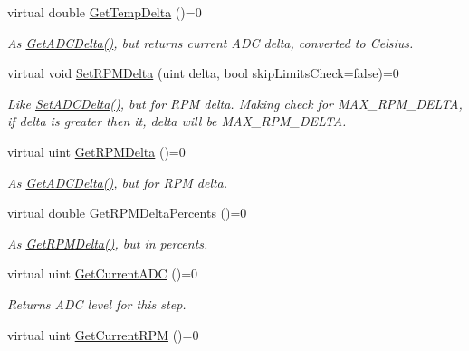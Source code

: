 \begin{DoxyCompactItemize}
virtual double \hyperlink{class_interfaces_1_1_i_settings_step_a7dd93517fbd9bc10a54b3b35a2f8bd78}{Get\+Temp\+Delta} ()=0
\begin{DoxyCompactList}\small\item\em As \hyperlink{class_interfaces_1_1_i_settings_step_ab77c6eaa45707ec4932a8f432b13ad78}{Get\+A\+D\+C\+Delta()}, but returns current A\+DC delta, converted to Celsius. \end{DoxyCompactList}\item 
virtual void \hyperlink{class_interfaces_1_1_i_settings_step_a62997701dc6ad91ec0a9d699ef99463e}{Set\+R\+P\+M\+Delta} (uint delta, bool skip\+Limits\+Check=false)=0
\begin{DoxyCompactList}\small\item\em Like \hyperlink{class_interfaces_1_1_i_settings_step_a83f00b8b66f6566721065e34e41508c6}{Set\+A\+D\+C\+Delta()}, but for R\+PM delta. Making check for M\+A\+X\+\_\+\+R\+P\+M\+\_\+\+D\+E\+L\+TA, if delta is greater then it, delta will be M\+A\+X\+\_\+\+R\+P\+M\+\_\+\+D\+E\+L\+TA. \end{DoxyCompactList}\item 
virtual uint \hyperlink{class_interfaces_1_1_i_settings_step_ace758dafae2a6bcbb0b1a3a64c802e3c}{Get\+R\+P\+M\+Delta} ()=0
\begin{DoxyCompactList}\small\item\em As \hyperlink{class_interfaces_1_1_i_settings_step_ab77c6eaa45707ec4932a8f432b13ad78}{Get\+A\+D\+C\+Delta()}, but for R\+PM delta. \end{DoxyCompactList}\item 
virtual double \hyperlink{class_interfaces_1_1_i_settings_step_a9db8c7569c5dc35b8541dc6e4d202df1}{Get\+R\+P\+M\+Delta\+Percents} ()=0
\begin{DoxyCompactList}\small\item\em As \hyperlink{class_interfaces_1_1_i_settings_step_ace758dafae2a6bcbb0b1a3a64c802e3c}{Get\+R\+P\+M\+Delta()}, but in percents. \end{DoxyCompactList}\item 
virtual uint \hyperlink{class_interfaces_1_1_i_settings_step_a54d5ce3350791e080bcb75d472376abf}{Get\+Current\+A\+DC} ()=0
\begin{DoxyCompactList}\small\item\em Returns A\+DC level for this step. \end{DoxyCompactList}\item 
virtual uint \hyperlink{class_interfaces_1_1_i_settings_step_ac2b2370bf70fb09a9e1da4db922e8903}{Get\+Current\+R\+PM} ()=0

\end{DoxyCompactItemize}
